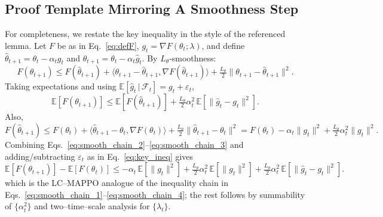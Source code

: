 \documentclass{article} %
\begin{document}
\subsection{Proof Template Mirroring A Smoothness Step}
For completeness, we restate the key inequality in the style of the referenced lemma.
Let $F$ be as in Eq.~\ref{eq:defF}, $g_t=\nabla F(\theta_t;\lambda)$, and define
$\widehat{\theta}_{t+1}=\theta_t-\alpha_t g_t$ and $\theta_{t+1}=\theta_t-\alpha_t\widehat{g}_t$.
By $L_\theta$-smoothness:
\begin{equation}\label{eq:smooth_chain_1}
F(\theta_{t+1}) \le F(\widehat{\theta}_{t+1})
+ \big\langle \theta_{t+1}-\widehat{\theta}_{t+1}, \nabla F(\widehat{\theta}_{t+1}) \big\rangle
+ \tfrac{L_\theta}{2}\|\theta_{t+1}-\widehat{\theta}_{t+1}\|^2.
\end{equation}
Taking expectations and using $\mathbb E[\widehat{g}_t\,|\,\mathcal F_t]=g_t+\varepsilon_t$,
\begin{equation}\label{eq:smooth_chain_2}
\mathbb E\!\left[F(\theta_{t+1})\right]
\le \mathbb E\!\left[F(\widehat{\theta}_{t+1})\right]
+ \tfrac{L_\theta}{2}\alpha_t^2\,\mathbb E\!\left[\|\widehat{g}_t-g_t\|^2\right].
\end{equation}
Also,
\begin{equation}\label{eq:smooth_chain_3}
F(\widehat{\theta}_{t+1}) \le F(\theta_t) + \langle \widehat{\theta}_{t+1}-\theta_t, \nabla F(\theta_t)\rangle
+ \tfrac{L_\theta}{2}\|\widehat{\theta}_{t+1}-\theta_t\|^2
= F(\theta_t) - \alpha_t\|g_t\|^2 + \tfrac{L_\theta}{2}\alpha_t^2\|g_t\|^2.
\end{equation}
Combining Eqs.~\ref{eq:smooth_chain_2}--\ref{eq:smooth_chain_3} and adding/subtracting $\varepsilon_t$ as in Eq.~\ref{eq:key_ineq} gives
\begin{equation}\label{eq:smooth_chain_4}
\mathbb E\!\left[F(\theta_{t+1})\right]-\mathbb E\!\left[F(\theta_t)\right]
\le -\alpha_t\,\mathbb E\!\left[\|g_t\|^2\right]
+ \tfrac{L_\theta}{2}\alpha_t^2\,\mathbb E\!\left[\|g_t\|^2\right]
+ \tfrac{L_\theta}{2}\alpha_t^2\,\mathbb E\!\left[\|\widehat{g}_t-g_t\|^2\right].
\end{equation}
which is the LC--MAPPO analogue of the inequality chain in
Eqs.~\ref{eq:smooth_chain_1}--\ref{eq:smooth_chain_4};
the rest follows by summability of $\{\alpha_t^2\}$ and two--time--scale analysis for $\{\lambda_t\}$.
\end{document}
